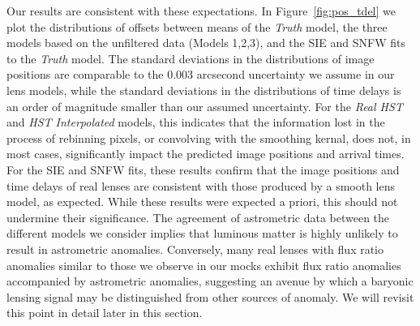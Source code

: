 Our results are consistent with these expectations. In Figure~\ref{fig:pos_tdel} we plot the distributions of offsets between
means of the \textit{Truth} model, the three models based on
the unfiltered data (Models 1,2,3), and the SIE and SNFW fits to the
\textit{Truth} model. The standard deviations in the
distributions of image positions are comparable to the 0.003 arcsecond
uncertainty we assume in our lens models, while the standard
deviations in the distributions of time delays is an order of
magnitude smaller than our assumed uncertainty. For the
\textit{Real HST} and \textit{HST Interpolated} models, this indicates that
the information lost in the process of rebinning pixels, or convolving
with the smoothing kernal, does not, in most cases, significantly impact the predicted image positions and arrival times. For the SIE and SNFW fits, these results confirm that the image positions and time delays of real lenses are consistent with those produced by a smooth lens model, as expected.
\newline \indent While these results were expected a priori, this should not undermine their significance. The agreement of astrometric data between the different models we consider implies that luminous matter is highly unlikely to result in astrometric anomalies. Conversely, many real lenses with flux ratio anomalies similar to those we observe in our mocks exhibit flux ratio anomalies accompanied by astrometric anomalies, suggesting an avenue by which a baryonic lensing signal may be distinguished from other sources of anomaly. We will revisit this point in detail later in this section.
